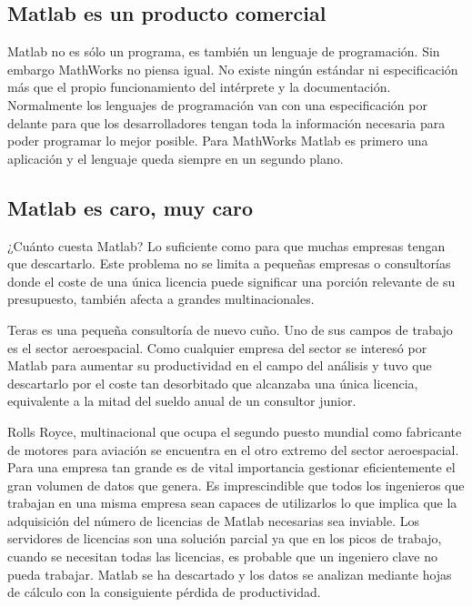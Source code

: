 \documentclass[10pt,letterpaper,conference]{ieeeconfspanish}
\begin{document}
\hypertarget{matlab-es-un-producto-comercial}{}
\subsection*{Matlab es un producto comercial}

Matlab no es sólo un programa, es también un lenguaje de
programación.  Sin embargo MathWorks no piensa igual.  No existe
ningún estándar ni especificación más que el propio funcionamiento del
intérprete y la documentación.  Normalmente los lenguajes de
programación van con una especificación por delante para que los
desarrolladores tengan toda la información necesaria para poder
programar lo mejor posible.  Para MathWorks Matlab es primero una
aplicación y el lenguaje queda siempre en un segundo plano.



\hypertarget{matlab-es-caro-muy-caro}{}
\subsection*{Matlab es caro, muy caro}

¿Cuánto cuesta Matlab? Lo suficiente como para que muchas empresas
tengan que descartarlo.  Este problema no se limita a pequeñas
empresas o consultorías donde el coste de una única licencia puede
significar una porción relevante de su presupuesto, también afecta a
grandes multinacionales.

Teras es una pequeña consultoría de nuevo cuño.  Uno de sus campos de
trabajo es el sector aeroespacial.  Como cualquier empresa del sector
se interesó por Matlab para aumentar su productividad en el campo del
análisis y tuvo que descartarlo por el coste tan desorbitado que
alcanzaba una única licencia, equivalente a la mitad del sueldo anual
de un consultor junior.

Rolls Royce, multinacional que ocupa el segundo puesto mundial como
fabricante de motores para aviación se encuentra en el otro extremo
del sector aeroespacial.  Para una empresa tan grande es de vital
importancia gestionar eficientemente el gran volumen de datos que
genera.  Es imprescindible que todos los ingenieros que trabajan en
una misma empresa sean capaces de utilizarlos lo que implica que la
adquisición del número de licencias de Matlab necesarias sea inviable.
Los servidores de licencias son una solución parcial ya que en los
picos de trabajo, cuando se necesitan todas las licencias, es probable
que un ingeniero clave no pueda trabajar.  Matlab se ha descartado y
los datos se analizan mediante hojas de cálculo con la consiguiente
pérdida de productividad.
\end{document}
